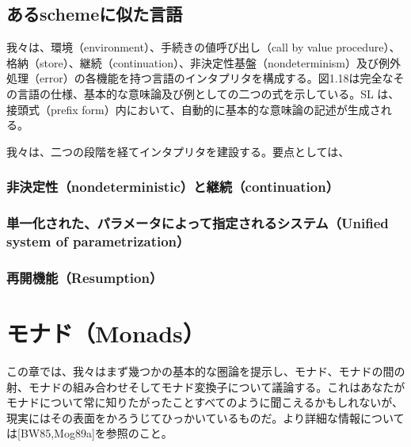 \documentclass[11pt, oneside]{jsarticle}   	%
\begin{document}
\subsection{あるschemeに似た言語}
我々は、環境（environment）、手続きの値呼び出し（call by value procedure）、格納（store）、継続（continuation）、非決定性基盤（nondeterminism）及び例外処理（error）の各機能を持つ言語のインタプリタを構成する。図1.18は完全なその言語の仕様、基本的な意味論及び例としての二つの式を示している。SL は、接頭式（prefix form）内において、自動的に基本的な意味論の記述が生成される。

我々は、二つの段階を経てインタプリタを建設する。要点としては、

\subsubsection{非決定性（nondeterministic）と継続（continuation）}













\subsubsection{単一化された、パラメータによって指定されるシステム（Unified system of parametrization）}
\subsubsection{再開機能（Resumption）}


\newpage
\section{ モナド（Monads）}
この章では、我々はまず幾つかの基本的な圏論を提示し、モナド、モナドの間の射、モナドの組み合わせそしてモナド変換子について議論する。これはあなたがモナドについて常に知りたがったことすべてのように聞こえるかもしれないが、現実にはその表面をかろうじてひっかいているものだ。より詳細な情報については[BW85,Mog89a]を参照のこと。
\end{document}
